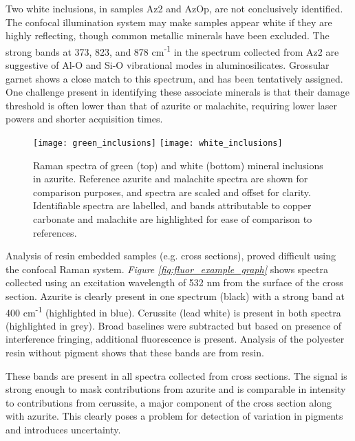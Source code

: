 Two white inclusions, in samples Az2 and AzOp, are not conclusively identified. The confocal illumination system may make samples appear white if they are highly reflecting, though common metallic minerals have been excluded. The strong bands at 373, 823, and 878 cm\textsuperscript{-1} in the spectrum collected from Az2 are suggestive of Al-O and Si-O vibrational modes in aluminosilicates. Grossular garnet shows a close match to this spectrum, and has been tentatively assigned.~\autocite{Culka} One challenge present in identifying these associate minerals is that their damage threshold is often lower than that of azurite or malachite, requiring lower laser powers and shorter acquisition times.

\begin{figure}[H]
\centering
\begin{minipage}[t]{\linewidth}
  \centering
  \texttt{[image: green\_inclusions]}
\hfill
\texttt{[image: white\_inclusions]}
\hfill
\end{minipage}
\caption[Raman spectra of green and white mineral inclusions in azurite.]{Raman spectra of green (top) and white (bottom) mineral inclusions in azurite. Reference azurite and malachite spectra are shown for comparison purposes, and spectra are scaled and offset for clarity. Identifiable spectra are labelled, and bands attributable to copper carbonate and malachite are highlighted for ease of comparison to references.}
\label{fig:label_raman}
\end{figure}

Analysis of resin embedded samples (e.g. cross sections), proved difficult using the confocal Raman system. \textit{Figure \ref{fig:fluor_example_graph}} shows spectra collected using an excitation wavelength of 532 nm from the surface of the cross section. Azurite is clearly present in one spectrum (black) with a strong band at 400 cm\textsuperscript{-1} (highlighted in blue). Cerussite (lead white) is present in both spectra (highlighted in grey). Broad baselines were subtracted but based on presence of interference fringing, additional fluorescence is present. Analysis of the polyester resin without pigment shows that these bands are from resin.

These bands are present in all spectra collected from cross sections. The signal is strong enough to mask contributions from azurite and is comparable in intensity to contributions from cerussite, a major component of the cross section along with azurite. This clearly poses a problem for detection of variation in pigments and introduces uncertainty.


